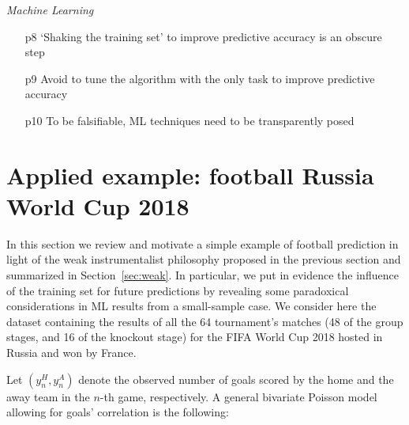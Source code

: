 \documentclass{statsoc}
\begin{document}
\begin{table}
{{\vspace{0.1cm}

\emph{ Machine Learning}
\begin{enumerate}
\item[p8] `Shaking the training set' to improve predictive accuracy is an obscure step
\vspace{-0.2cm}
\item[p9] Avoid to tune the algorithm with the only task to improve predictive accuracy
\vspace{-0.2cm}
\item[ p10] To be falsifiable, ML techniques need to be transparently posed
\end{enumerate}
 }}
\end{table}



\section{Applied example: football Russia World Cup 2018}
\label{sec:world}

\color{blue}

\color{black}

In this section we review and motivate a simple example of football prediction in light of  the weak instrumentalist philosophy proposed in the previous section and summarized in Section~\ref{sec:weak}. In particular, we put in evidence the influence of the training set for future predictions by revealing some paradoxical considerations  in ML results from  a small-sample case. We consider here the dataset containing the results of all the 64 tournament's matches (48 of the group stages, and 16 of the knockout stage) for the FIFA World Cup 2018 hosted in Russia and won by France.

Let $(y^{H}_{n}, y^{A}_{n})$ denote the observed number of goals scored by the home and the away team in the $n$-th game, respectively. A general bivariate Poisson model allowing for goals' correlation \citep{karlis2003analysis} is the following:
\end{document}
